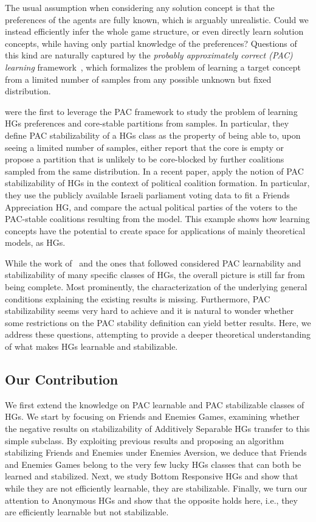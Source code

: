 \documentclass[letterpaper]{article} %
\begin{document}
The usual assumption when considering any solution concept is that the preferences of the agents are fully known, which is arguably unrealistic.
Could we instead efficiently infer the whole game structure, or even directly learn solution concepts, while having only partial knowledge of the preferences?
Questions of this kind are naturally captured by the \emph{probably approximately correct (PAC) learning} framework~\cite{Valiant84}, which formalizes the problem of learning a target concept from a limited number of samples from any possible unknown but fixed distribution.

\citet{SliwinskiZ17} were the first to leverage the PAC framework to study the problem of learning HGs preferences and core-stable partitions from samples. In particular, they define PAC stabilizability of a HGs class as the property of being able to, upon seeing a limited number of samples, either report that the core is empty or propose a partition that is unlikely to be core-blocked by further coalitions sampled from the same distribution.
%
In a recent paper, \citet{HG_Knesset} apply the notion of PAC stabilizability of HGs in the context of political coalition formation. In particular, they use the publicly available Israeli parliament voting data to fit a Friends Appreciation HG, and compare the actual political parties of the voters to the PAC-stable coalitions resulting from the model. This example shows how learning concepts have the potential to create space for applications of mainly theoretical models, as HGs.


While the work of~\citet{SliwinskiZ17} and the ones that followed considered PAC learnability and stabilizability of many specific classes of HGs, the overall picture is still far from being complete. Most prominently, the characterization of the underlying general conditions explaining the existing results is missing. Furthermore, PAC stabilizability seems very hard to achieve and it is natural to wonder whether some restrictions on the PAC stability definition can yield better results.
Here, we address these questions, attempting to provide a deeper theoretical understanding of what makes HGs learnable and stabilizable.

\subsection{Our Contribution}
We first extend the knowledge on PAC learnable and PAC stabilizable classes of HGs. We start by focusing on Friends and Enemies Games, examining whether the negative results on stabilizability of Additively Separable HGs transfer to this simple subclass. By exploiting previous results and proposing an algorithm stabilizing Friends and Enemies under Enemies Aversion, we deduce that Friends and Enemies Games belong to the very few lucky HGs classes that can both be learned and stabilized. Next, we study Bottom Responsive HGs and show that while they are not efficiently learnable, they are stabilizable. Finally, we turn our attention to Anonymous HGs and show that the opposite holds here, i.e., they are efficiently learnable but not stabilizable.
\end{document}
